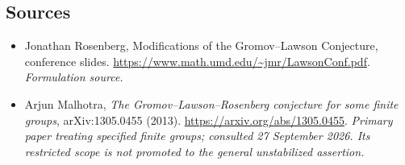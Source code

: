 \documentclass[11pt]{article}
\begin{document}
\subsection{Sources}
\begin{itemize}
\item[S1]Jonathan Rosenberg, Modifications of the Gromov–Lawson Conjecture, conference slides.
\url{https://www.math.umd.edu/~jmr/LawsonConf.pdf}.
\textit{Formulation source.}
\item[E1]Arjun Malhotra, \emph{The Gromov--Lawson--Rosenberg conjecture for some finite groups}, arXiv:1305.0455 (2013).
\url{https://arxiv.org/abs/1305.0455}.
\textit{Primary paper treating specified finite groups; consulted 27 September 2026. Its restricted scope is not promoted to the general unstabilized assertion.}
\end{itemize}
\end{document}
